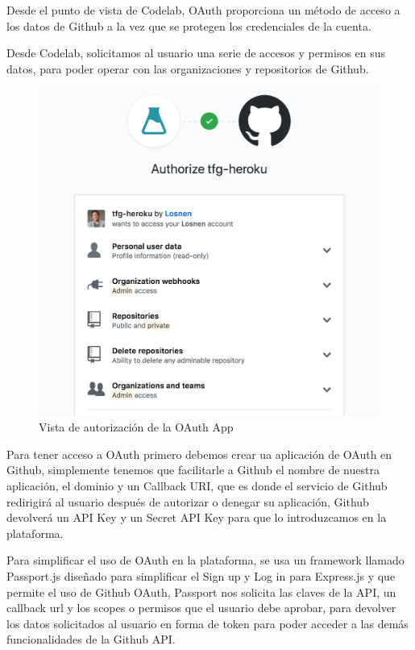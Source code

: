 Desde el punto de vista de Codelab, OAuth proporciona un método de acceso a los datos de Github a la vez que se protegen los credenciales de la cuenta.

Desde Codelab, solicitamos al usuario una serie de accesos y permisos en sus datos, para poder operar con las organizaciones y repositorios de Github.

\begin{figure}[!th]
\begin{center}
\includegraphics[scale=0.5]{images/permisos}
\caption{Vista de autorización de la OAuth App}
\label{fig:Vista de la OAuth App}
\end{center}
\end{figure}

Para tener acceso a OAuth primero debemos crear ua aplicación de OAuth en Github, simplemente tenemos que facilitarle a Github el nombre de nuestra aplicación, el dominio y un Callback URI, que es donde el servicio de Github redirigirá al usuario después de autorizar o denegar su aplicación,
Github devolverá un API Key y un Secret API Key para que lo introduzcamos en la plataforma. 

Para simplificar el uso de OAuth en la plataforma, se usa un framework llamado Passport.js diseñado para simplificar el Sign up y Log in para Express.js y que permite el uso de Github OAuth, 
Passport nos solicita las claves de la API, un callback url y los scopes o permisos que el usuario debe aprobar, para devolver los datos solicitados al usuario en forma de token para poder acceder a las demás funcionalidades de la Github API.

